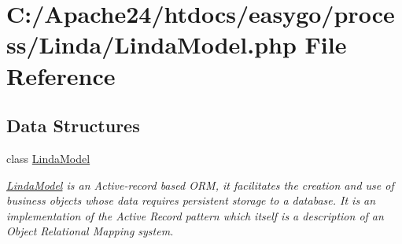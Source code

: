 \hypertarget{_linda_model_8php}{}\section{C\+:/\+Apache24/htdocs/easygo/process/\+Linda/\+Linda\+Model.php File Reference}
\label{_linda_model_8php}
\subsection*{Data Structures}
\begin{DoxyCompactItemize}
\item 
class \hyperlink{class_linda_model}{Linda\+Model}
\begin{DoxyCompactList}\small\item\em \hyperlink{class_linda_model}{Linda\+Model} is an Active-\/record based O\+R\+M, it facilitates the creation and use of business objects whose data requires persistent storage to a database. It is an implementation of the Active Record pattern which itself is a description of an Object Relational Mapping system. \end{DoxyCompactList}\end{DoxyCompactItemize}
